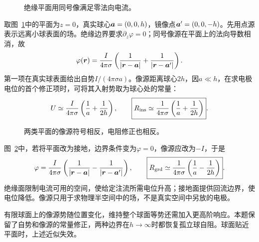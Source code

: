 \begin{figure}[H]\centering
{}
\caption{绝缘平面用同号像满足零法向电流。}\label{fig:c1-buried-q}
\end{figure}
\begin{solution}
取图~\ref{fig:c1-buried-q}中的平面为$z=0$，真实球心$\bm{a}=(0,0,h)$，镜像点$\bm{a}'=(0,0,-h)$。先用点源表示远离小球表面的场。绝缘边界要求$\partial_z\varphi=0$；同号像源在平面上的法向导数相消，故
\[
 \varphi(\bm{r})=\frac I{4\pi\sigma}
 \left(\frac1{|\bm{r}-\bm{a}|}+\frac1{|\bm{r}-\bm{a}'|}\right).
\]
第一项在真实球表面给出自势$I/(4\pi\sigma a)$。像源距离球心$2h$，因$a\ll h$，在求电极电位的首个修正项时，可将其入射势取为球心处的常量：
\[
 U\simeq\frac I{4\pi\sigma}\left(\frac1a+\frac1{2h}\right),\qquad
 \boxed{R_{\rm ins}\simeq\frac1{4\pi\sigma}\left(\frac1a+\frac1{2h}\right)}.
\]
\begin{figure}[H]\centering
{}
\caption{两类平面的像源符号相反，电阻修正也相反。}\label{fig:c1-buried-s}
\end{figure}
图~\ref{fig:c1-buried-s}中，若将平面改为接地，边界条件变为$\varphi=0$，像源应改为$-I$，于是
\[
 \varphi=\frac I{4\pi\sigma}\left(\frac1{|\bm{r}-\bm{a}|}-\frac1{|\bm{r}-\bm{a}'|}\right),\qquad
 \boxed{R_{\rm grd}\simeq\frac1{4\pi\sigma}\left(\frac1a-\frac1{2h}\right)}.
\]
绝缘面限制电流可用的空间，使给定注流所需电位升高；接地面提供回流边界，使电位降低。像源只用于求物理半空间中的场，不是真实空间中另放的电极。

有限球面上的像源势随位置变化，维持整个球面等势还需加入更高阶响应。本题保留了自势和像源的常量修正，两种边界在$h\to\infty$时都恢复孤立球自阻。球面贴近平面时，上述近似失效。
\end{solution}

